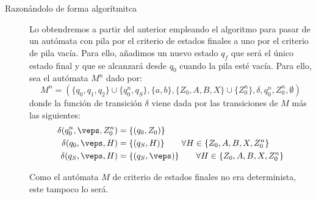 \begin{ejercicio}
\begin{enumerate}
\begin{description}
            \item[Razonándolo de forma algorítmitca] Lo obtendremos a partir del anterior empleando el algoritmo para pasar de un autómata con pila por el criterio de estados finales a uno por el criterio de pila vacía. Para ello, añadimos un nuevo estado $q_f$ que será el único estado final y que se alcanzará desde $q_0$ cuando la pila esté vacía. Para ello, sea el autómata $M^n$ dado por:
            \begin{equation*}
                M^n = (\{q_0,q_1,q_2\}\cup \{q_0^n,q_S\},\{a,b\},\{Z_0,A,B,X\}\cup \{Z_0^n\},\delta,q_0^n,Z_0^n,\emptyset)
            \end{equation*}
            donde la función de transición $\delta$ viene dada por las transiciones de $M$ más las siguientes:
            \begin{align*}
                \delta(q_0^n,\veps,Z_0^n) &= \{(q_0,Z_0)\}\\
                \delta(q_0,\veps,H) &= \{(q_S,H)\} \qquad \forall H\in \{Z_0, A,B,X, Z_0^n\}\\
                \delta(q_S,\veps,H) &= \{(q_S,\veps)\} \qquad \forall H\in \{Z_0, A,B,X, Z_0^n\}
            \end{align*}

            Como el autómata $M$ de criterio de estados finales no era determinista, este tampoco lo será.
        \end{description}
    \end{enumerate}
\end{ejercicio}

